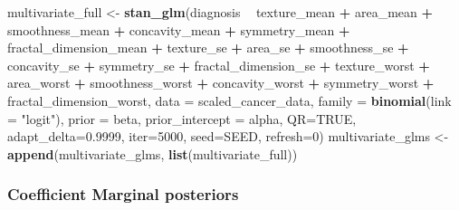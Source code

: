\documentclass[
]{article}
\newenvironment{Shaded}{\begin{snugshade}}{\end{snugshade}}
\newcommand{\DataTypeTok}[1]{\textcolor[rgb]{0.13,0.29,0.53}{#1}}
\newcommand{\DecValTok}[1]{\textcolor[rgb]{0.00,0.00,0.81}{#1}}
\newcommand{\FloatTok}[1]{\textcolor[rgb]{0.00,0.00,0.81}{#1}}
\newcommand{\KeywordTok}[1]{\textcolor[rgb]{0.13,0.29,0.53}{\textbf{#1}}}
\newcommand{\NormalTok}[1]{#1}
\newcommand{\OperatorTok}[1]{\textcolor[rgb]{0.81,0.36,0.00}{\textbf{#1}}}
\newcommand{\OtherTok}[1]{\textcolor[rgb]{0.56,0.35,0.01}{#1}}
\newcommand{\StringTok}[1]{\textcolor[rgb]{0.31,0.60,0.02}{#1}}
\begin{document}
\begin{Shaded}
\begin{Highlighting}[]
\NormalTok{multivariate_full <-}\StringTok{ }\KeywordTok{stan_glm}\NormalTok{(diagnosis }\OperatorTok{~}\StringTok{ }\NormalTok{texture_mean }\OperatorTok{+}\StringTok{ }\NormalTok{area_mean}
                              \OperatorTok{+}\StringTok{ }\NormalTok{smoothness_mean }\OperatorTok{+}\StringTok{ }\NormalTok{concavity_mean}
                              \OperatorTok{+}\StringTok{ }\NormalTok{symmetry_mean }\OperatorTok{+}\StringTok{ }\NormalTok{fractal_dimension_mean}
                              \OperatorTok{+}\StringTok{ }\NormalTok{texture_se }\OperatorTok{+}\StringTok{ }\NormalTok{area_se }\OperatorTok{+}\StringTok{ }\NormalTok{smoothness_se}
                              \OperatorTok{+}\StringTok{ }\NormalTok{concavity_se }\OperatorTok{+}\StringTok{ }\NormalTok{symmetry_se}
                              \OperatorTok{+}\StringTok{ }\NormalTok{fractal_dimension_se }\OperatorTok{+}\StringTok{ }\NormalTok{texture_worst}
                              \OperatorTok{+}\StringTok{ }\NormalTok{area_worst }\OperatorTok{+}\StringTok{ }\NormalTok{smoothness_worst }\OperatorTok{+}\StringTok{ }\NormalTok{concavity_worst}
                              \OperatorTok{+}\StringTok{ }\NormalTok{symmetry_worst }\OperatorTok{+}\StringTok{ }\NormalTok{fractal_dimension_worst,}
                              \DataTypeTok{data =}\NormalTok{ scaled_cancer_data,}
                              \DataTypeTok{family =} \KeywordTok{binomial}\NormalTok{(}\DataTypeTok{link =} \StringTok{"logit"}\NormalTok{), }
                              \DataTypeTok{prior =}\NormalTok{ beta, }\DataTypeTok{prior_intercept =}\NormalTok{ alpha, }\DataTypeTok{QR=}\OtherTok{TRUE}\NormalTok{, }
                              \DataTypeTok{adapt_delta=}\FloatTok{0.9999}\NormalTok{, }\DataTypeTok{iter=}\DecValTok{5000}\NormalTok{,}
                              \DataTypeTok{seed=}\NormalTok{SEED, }\DataTypeTok{refresh=}\DecValTok{0}\NormalTok{)}
\NormalTok{multivariate_glms <-}\StringTok{ }\KeywordTok{append}\NormalTok{(multivariate_glms, }\KeywordTok{list}\NormalTok{(multivariate_full))}
\end{Highlighting}
\end{Shaded}

\hypertarget{coefficient-marginal-posteriors}{%
\subsubsection{Coefficient Marginal
posteriors}\label{coefficient-marginal-posteriors}}
\end{document}

